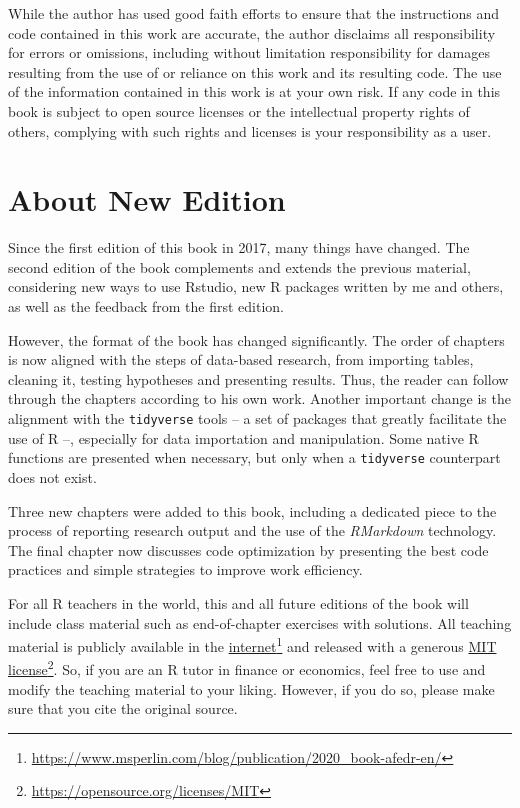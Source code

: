 \documentclass[
  12pt,
]{book}
\begin{document}
\vspace{0.5cm}

\small{While the author has used good faith efforts to ensure that the instructions and code contained in this work are accurate, the author disclaims all responsibility for errors or omissions, including without limitation responsibility for damages resulting from the use of or reliance on this work and its resulting code. The use of the information contained in this work is at your own risk. If any code in this book is subject to open source licenses or the intellectual property rights of others, complying with such rights and licenses is your responsibility as a user.}

{
\setcounter{tocdepth}{2}
\tableofcontents
}
\hypertarget{about-new-edition}{%
\chapter*{About New Edition}\label{about-new-edition}}

Since the first edition of this book in 2017, many things have changed. The second edition of the book complements and extends the previous material, considering new ways to use Rstudio, new R packages written by me and others, as well as the feedback from the first edition.

However, the format of the book has changed significantly. The order of chapters is now aligned with the steps of data-based research, from importing tables, cleaning it, testing hypotheses and presenting results. Thus, the reader can follow through the chapters according to his own work. Another important change is the alignment with the \texttt{tidyverse} tools -- a set of packages that greatly facilitate the use of R --, especially for data importation and manipulation. Some native R functions are presented when necessary, but only when a \texttt{tidyverse} counterpart does not exist.

Three new chapters were added to this book, including a dedicated piece to the process of reporting research output and the use of the \emph{RMarkdown} technology. The final chapter now discusses code optimization by presenting the best code practices and simple strategies to improve work efficiency.

For all R teachers in the world, this and all future editions of the book will include class material such as end-of-chapter exercises with solutions. All teaching material is publicly available in the \href{https://www.msperlin.com/blog/publication/2020_book-afedr-en/}{internet}\footnote{\url{https://www.msperlin.com/blog/publication/2020_book-afedr-en/}} and released with a generous \href{https://opensource.org/licenses/MIT}{MIT license}\footnote{\url{https://opensource.org/licenses/MIT}}. So, if you are an R tutor in finance or economics, feel free to use and modify the teaching material to your liking. However, if you do so, please make sure that you cite the original source.
\end{document}
